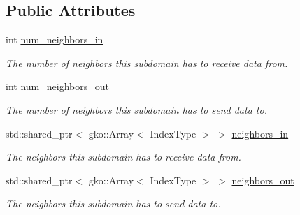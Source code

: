 \subsection*{Public Attributes}
\begin{DoxyCompactItemize}
\item 
\mbox{\label{structschwz_1_1Communicate_1_1comm__struct_a67323ca81cff7f4b7567616133475d84}} 
int \hyperlink{structschwz_1_1Communicate_1_1comm__struct_a67323ca81cff7f4b7567616133475d84}{num\+\_\+neighbors\+\_\+in}
\begin{DoxyCompactList}\small\item\em The number of neighbors this subdomain has to receive data from. \end{DoxyCompactList}\item 
\mbox{\label{structschwz_1_1Communicate_1_1comm__struct_abc044f2335e50d56d367b37432aa6042}} 
int \hyperlink{structschwz_1_1Communicate_1_1comm__struct_abc044f2335e50d56d367b37432aa6042}{num\+\_\+neighbors\+\_\+out}
\begin{DoxyCompactList}\small\item\em The number of neighbors this subdomain has to send data to. \end{DoxyCompactList}\item 
\mbox{\label{structschwz_1_1Communicate_1_1comm__struct_a4751a74b08aa00a5c1badb6c996c98e5}} 
std\+::shared\+\_\+ptr$<$ gko\+::\+Array$<$ Index\+Type $>$ $>$ \hyperlink{structschwz_1_1Communicate_1_1comm__struct_a4751a74b08aa00a5c1badb6c996c98e5}{neighbors\+\_\+in}
\begin{DoxyCompactList}\small\item\em The neighbors this subdomain has to receive data from. \end{DoxyCompactList}\item 
\mbox{\label{structschwz_1_1Communicate_1_1comm__struct_acd95752d7818e28dd3e6c5e3f5c64ce4}} 
std\+::shared\+\_\+ptr$<$ gko\+::\+Array$<$ Index\+Type $>$ $>$ \hyperlink{structschwz_1_1Communicate_1_1comm__struct_acd95752d7818e28dd3e6c5e3f5c64ce4}{neighbors\+\_\+out}
\begin{DoxyCompactList}\small\item\em The neighbors this subdomain has to send data to. \end{DoxyCompactList}\item 

\end{DoxyCompactItemize}
